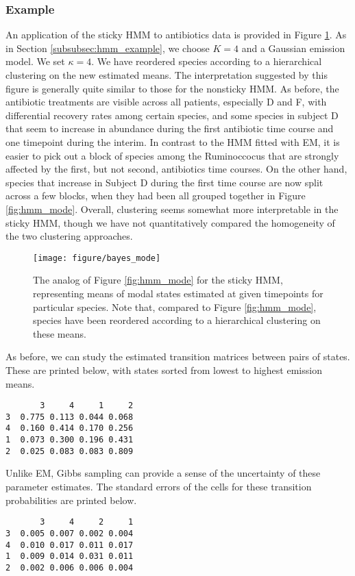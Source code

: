 \documentclass[14pt]{extreport}
\begin{document}
\subsubsection{Example}
\label{subsubsec:sticky_hmm_example}

An application of the sticky HMM to antibiotics data is provided in Figure
\ref{fig:bayes_mode}. As in Section \ref{subsubsec:hmm_example}, we choose $K =
4$ and a Gaussian emission model. We set $\kappa = 4$. We have reordered
species according to a hierarchical clustering on the new estimated means. The
interpretation suggested by this figure is generally quite similar to those for
the nonsticky HMM. As before, the antibiotic treatments are visible across all
patients, especially D and F, with differential recovery rates among certain
species, and some species in subject D that seem to increase in abundance
during the first antibiotic time course and one timepoint during the interim.
In contrast to the HMM fitted with EM, it is easier to pick out a block of
species among the Ruminoccocus that are strongly affected by the first, but not
second, antibiotics time courses. On the other hand, species that increase in
Subject D during the first time course are now split across a few blocks, when
they had been all grouped together in Figure \ref{fig:hmm_mode}. Overall,
clustering seems somewhat more interpretable in the sticky HMM, though we have
not quantitatively compared the homogeneity of the two clustering approaches.

\begin{figure}
  \centering
  \texttt{[image: figure/bayes\_mode]}
  \caption{The analog of Figure \ref{fig:hmm_mode} for the sticky HMM,
    representing means of modal states estimated at given timepoints for
    particular species. Note that, compared to Figure \ref{fig:hmm_mode},
    species have been reordered according to a hierarchical clustering on these
    means. \label{fig:bayes_mode} }
\end{figure}

As before, we can study the estimated transition matrices between pairs of
states. These are printed below, with states sorted from lowest to highest
emission means.
\begin{verbatim}
       3     4     1     2
3  0.775 0.113 0.044 0.068
4  0.160 0.414 0.170 0.256
1  0.073 0.300 0.196 0.431
2  0.025 0.083 0.083 0.809
\end{verbatim}

Unlike EM, Gibbs sampling can provide a sense of the uncertainty of these
parameter estimates. The standard errors of the cells for these transition
probabilities are printed below.
\begin{verbatim}
       3     4     2     1
3  0.005 0.007 0.002 0.004
4  0.010 0.017 0.011 0.017
1  0.009 0.014 0.031 0.011
2  0.002 0.006 0.006 0.004
\end{verbatim}
\end{document}
